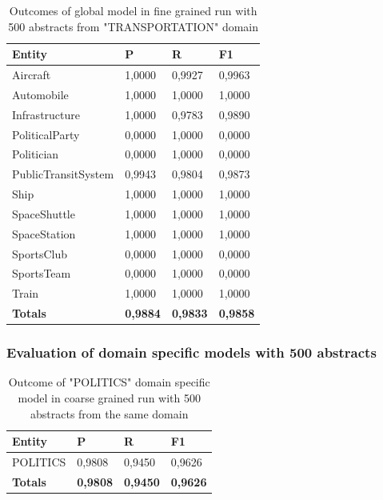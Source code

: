 \documentclass[thesis=M,english]{FITthesis}[2018/05/30]
\begin{document}
	\begin{table}[H]\centering
		\begin{tabular}{|l|l|l|l|}
			\hline {\textbf{Entity}} & {\textbf{P}} & {\textbf{R}} & {\textbf{F1}}\\\hline
				Aircraft & 1,0000 & 0,9927 & 0,9963\\
				Automobile & 1,0000 & 1,0000 & 1,0000\\				
				Infrastructure & 1,0000 & 0,9783 & 0,9890\\
				PoliticalParty & 0,0000 & 1,0000 & 0,0000\\				
				Politician & 0,0000 & 1,0000 & 0,0000\\				
				PublicTransitSystem & 0,9943 & 0,9804 & 0,9873\\
				Ship & 1,0000 & 1,0000 & 1,0000\\				
				SpaceShuttle & 1,0000 & 1,0000 & 1,0000\\
				SpaceStation & 1,0000 & 1,0000 & 1,0000\\
				SportsClub & 0,0000 & 1,0000 & 0,0000\\
				SportsTeam & 0,0000 & 1,0000 & 0,0000\\
				Train & 1,0000 & 1,0000 & 1,0000\\\hline
				\textbf{Totals} & \textbf{0,9884} & \textbf{0,9833} & \textbf{0,9858}\\\hline
		\end{tabular}
		\caption{Outcomes of global model in fine grained run with 500 abstracts from "TRANSPORTATION" domain \label{table:500GlobalDomainWithTransportationTop500Fine}}
	\end{table}		
	

\subsubsection{Evaluation of domain specific models with 500 abstracts}

	\begin{table}[H]\centering
		\begin{tabular}{|l|l|l|l|}
			\hline {\textbf{Entity}} & {\textbf{P}} & {\textbf{R}} & {\textbf{F1}}\\\hline
				POLITICS & 0,9808 & 0,9450 & 0,9626\\\hline
				\textbf{Totals} & \textbf{0,9808} & \textbf{0,9450} & \textbf{0,9626}\\\hline
		\end{tabular}
		\caption{Outcome of "POLITICS" domain specific model in coarse grained run with 500 abstracts from the same domain \label{table:500PoliticsDomainWithPoliticsTop500Coarse}}
	\end{table}
\end{document}

